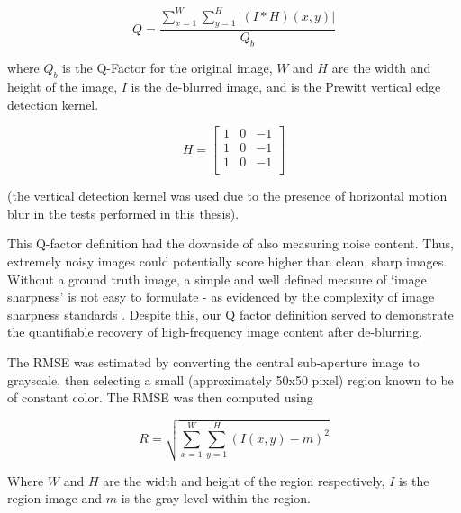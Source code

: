 \begin{equation}
Q = \frac{\sum_{x=1}^{W} \sum_{y=1}^{H}
\left| (I \ast H)(x, y) \right|
\label{eq:q_factor}}{Q_b}
\end{equation}

where $Q_b$ is the Q-Factor for the original image, $W$ and $H$ are the width and height of the image, $I$ is the de-blurred image, and is the Prewitt vertical edge detection kernel.

\begin{equation}
H = 
\begin{bmatrix}
1 & 0 & -1 \\
1 & 0 & -1 \\
1 & 0 & -1 \\
\end{bmatrix}
\label{eq:prewitt_filter}
\end{equation}

(the vertical detection kernel was used due to the presence of horizontal motion blur in the tests performed in this thesis).

This Q-factor definition had the downside of also measuring noise content.
Thus, extremely noisy images could potentially score higher than clean, sharp images.
Without a ground truth image, a simple and well defined measure of \enquote*{image sharpness} is not easy to formulate  - as evidenced by the complexity of image sharpness standards \cite{imatest2014sharpness}.
Despite this, our Q factor definition served to demonstrate the quantifiable recovery of high-frequency image content after de-blurring.

The RMSE was estimated by converting the central sub-aperture image to grayscale, then selecting a small (approximately 50x50 pixel) region known to be of constant color.
The RMSE was then computed using

\begin{equation}
R = \sqrt{ \sum_{x=1}^{W} \sum_{y=1}^{H} (I(x,y) - m)^2 }
\end{equation}

Where $W$ and $H$ are the width and height of the region respectively, $I$ is the region image and $m$ is the gray level within the region.

